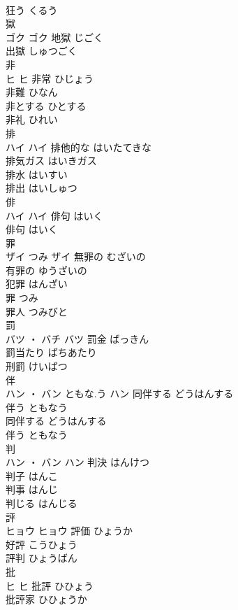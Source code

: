 \documentclass[8pt]{extreport}
\begin{document}
\begin{CJK}{UTF8}{min}
\\	狂う	くるう	
\\	獄	
\\	ゴク		ゴク	地獄	じごく	
\\	出獄	しゅつごく	
\\	非	
\\	ヒ		ヒ	非常	ひじょう	
\\	非難	ひなん	
\\	非とする	ひとする	
\\	非礼	ひれい	
\\	排	
\\	ハイ		ハイ	排他的な	はいたてきな	
\\	排気ガス	はいきガス	
\\	排水	はいすい	
\\	排出	はいしゅつ	
\\	俳	
\\	ハイ		ハイ	俳句	はいく	
\\	俳句	はいく	
\\	罪	
\\	ザイ	つみ	ザイ	無罪の	むざいの	
\\	有罪の	ゆうざいの	
\\	犯罪	はんざい	
\\	罪	つみ	
\\	罪人	つみびと	
\\	罰	
\\	バツ ・ バチ		バツ	罰金	ばっきん	
\\	罰当たり	ばちあたり	
\\	刑罰	けいばつ	
\\	伴	
\\	ハン ・ バン	ともな.う	ハン	同伴する	どうはんする	
\\	伴う	ともなう	
\\	同伴する	どうはんする	
\\	伴う	ともなう	
\\	判	
\\	ハン ・ バン		ハン	判決	はんけつ	
\\	判子	はんこ	
\\	判事	はんじ	
\\	判じる	はんじる	
\\	評	
\\	ヒョウ		ヒョウ	評価	ひょうか	
\\	好評	こうひょう	
\\	評判	ひょうばん	
\\	批	
\\	ヒ		ヒ	批評	ひひょう	
\\	批評家	ひひょうか	

\end{CJK}
\end{document}

